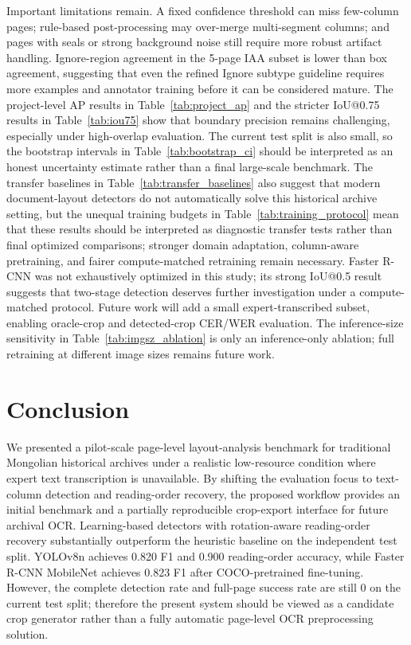 \documentclass[12pt]{article}
\begin{document}
Important limitations remain. A fixed confidence threshold can miss few-column pages; rule-based post-processing may over-merge multi-segment columns; and pages with seals or strong background noise still require more robust artifact handling. Ignore-region agreement in the 5-page IAA subset is lower than box agreement, suggesting that even the refined Ignore subtype guideline requires more examples and annotator training before it can be considered mature. The project-level AP results in Table~\ref{tab:project_ap} and the stricter IoU@0.75 results in Table~\ref{tab:iou75} show that boundary precision remains challenging, especially under high-overlap evaluation. The current test split is also small, so the bootstrap intervals in Table~\ref{tab:bootstrap_ci} should be interpreted as an honest uncertainty estimate rather than a final large-scale benchmark. The transfer baselines in Table~\ref{tab:transfer_baselines} also suggest that modern document-layout detectors do not automatically solve this historical archive setting, but the unequal training budgets in Table~\ref{tab:training_protocol} mean that these results should be interpreted as diagnostic transfer tests rather than final optimized comparisons; stronger domain adaptation, column-aware pretraining, and fairer compute-matched retraining remain necessary. Faster R-CNN was not exhaustively optimized in this study; its strong IoU@0.5 result suggests that two-stage detection deserves further investigation under a compute-matched protocol. Future work will add a small expert-transcribed subset, enabling oracle-crop and detected-crop CER/WER evaluation. The inference-size sensitivity in Table~\ref{tab:imgsz_ablation} is only an inference-only ablation; full retraining at different image sizes remains future work.

\section{Conclusion}
We presented a pilot-scale page-level layout-analysis benchmark for traditional Mongolian historical archives under a realistic low-resource condition where expert text transcription is unavailable. By shifting the evaluation focus to text-column detection and reading-order recovery, the proposed workflow provides an initial benchmark and a partially reproducible crop-export interface for future archival OCR. Learning-based detectors with rotation-aware reading-order recovery substantially outperform the heuristic baseline on the independent test split. YOLOv8n achieves 0.820 F1 and 0.900 reading-order accuracy, while Faster R-CNN MobileNet achieves 0.823 F1 after COCO-pretrained fine-tuning. However, the complete detection rate and full-page success rate are still 0 on the current test split; therefore the present system should be viewed as a candidate crop generator rather than a fully automatic page-level OCR preprocessing solution.
\end{document}

